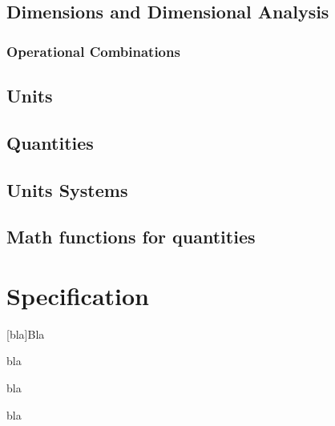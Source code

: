 \documentclass[ebook,11pt,article]{memoir}
\begin{document}
\section{Dimensions and Dimensional Analysis}

\subsection{Operational Combinations}

\section{Units}

\section{Quantities}

\section{Units Systems}

\section{Math functions for quantities}

\chapter{Specification}


[bla]{Bla}

%
\begin{itemdecl}
bla
\end{itemdecl}

\begin{itemdescr}
\pnum
\requires
bla

\pnum
\effects
bla
\end{itemdescr}
\end{document}
